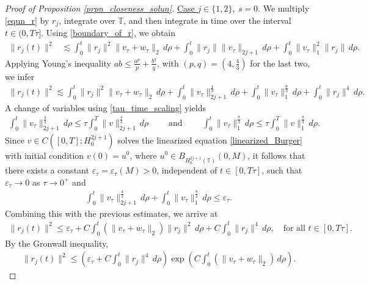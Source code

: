 \documentclass[10pt, reqno]{amsart}
\numberwithin{equation}{section}
\begin{document}
\begin{proof}[Proof of Proposition \ref{prpn_closeness_solun}]
\underline{Case \( j \in \{1, 2\}, \ s = 0 \)}. We multiply \eqref{equn_r} by \( r_j \), integrate over \( \mathbb{T} \), and then integrate in time over the interval \( t \in (0, T\tau] \). Using \eqref{boundary_of_r}, we obtain  
\begin{align} \label{est_s = 0}
	\| r_j(t)\|^2 & \lesssim \int_{0}^{t} \|r_j\|^2 \| v_{\tau} + w_{\tau} \|_{2} \, d\rho + \int_{0}^{t} \|r_j\| \| v_{\tau} \|_{2j + 1} \, d\rho + \int_{0}^{t} \|v_{\tau}\|_1^2 \|r_j\| \, d\rho.
\end{align}
Applying Young’s inequality \( ab \leq \frac{a^p}{p} + \frac{b^q}{q} \), with  \( (p, q) = (4, \tfrac{4}{3}) \) for the last two, we infer
\begin{align*}
	\| r_j(t)\|^2 \lesssim \int_{0}^{t} \|r_j\|^2 \| v_{\tau} + w_{\tau} \|_{2} \, d\rho + \int_{0}^{t} \|v_{\tau}\|_{2j + 1}^{\frac{4}{3}} \, d\rho + \int_{0}^{t} \|v_{\tau}\|_{1}^{\frac{8}{3}} \, d\rho + \int_{0}^{t} \| r_j\|^4 \, d\rho.
\end{align*}
A change of variables using \eqref{tau_time_scaling} yields
\begin{align}\label{norm_v_tau}
	\int_{0}^{t} \|v_{\tau}\|_{2j + 1}^{\frac{4}{3}} \, d\rho \leq \tau \int_{0}^{T} \|v\|_{2j + 1}^{\frac{4}{3}} \, d\rho \qquad \text{ and } \qquad \int_{0}^{t} \|v_{\tau}\|_{1}^{\frac{8}{3}} \, d\rho \leq \tau \int_{0}^{T} \|v\|_{1}^{\frac{8}{3}} \, d\rho.
\end{align}
Since \( v \in C([0, T]; H_0^{2j + 1}) \) solves the linearized equation \eqref{linearized_Burger} with initial condition \( v(0) = u^0 \), where \( u^0 \in B_{H_0^{2j + 1}(\mathbb{T})}(0, M) \), it follows that there exists a constant \( \varepsilon_{\tau} = \varepsilon_{\tau}(M) > 0 \), independent of \( t \in [0, T\tau] \), such that \( \varepsilon_{\tau} \to 0 \) as \( \tau \to 0^+ \) and 
\begin{align*}
\int_{0}^{t} \|v_{\tau}\|_{2j + 1}^{\frac{4}{3}} \, d\rho + \int_{0}^{t} \|v_{\tau}\|_{1}^{\frac{8}{3}} \, d\rho \le \varepsilon_{\tau}.
\end{align*} 
Combining this with the previous estimates, we arrive at
\begin{align}\label{combining_s0_any_j}
	\| r_j(t) \|^2 \le \varepsilon_{\tau} + C \int_{0}^{t}  (\| v_{\tau} + w_{\tau} \|_{2}) \|r_j\|^2 \, d\rho + C \int_0^t \| r_j \|^4 \, d\rho, \quad \text{for all } t \in [0, T\tau].
\end{align}
By the Gronwall inequality,
\begin{align*} 
	\| r_j(t) \|^2 \le \left(\varepsilon_{\tau} + C \int_0^t \| r_j \|^4 \, d\rho\right) \exp \left(C \int_{0}^{t}  (\| v_{\tau} + w_{\tau} \|_{2})  \, d\rho \right).

\end{align*}
\end{proof}
\end{document}
